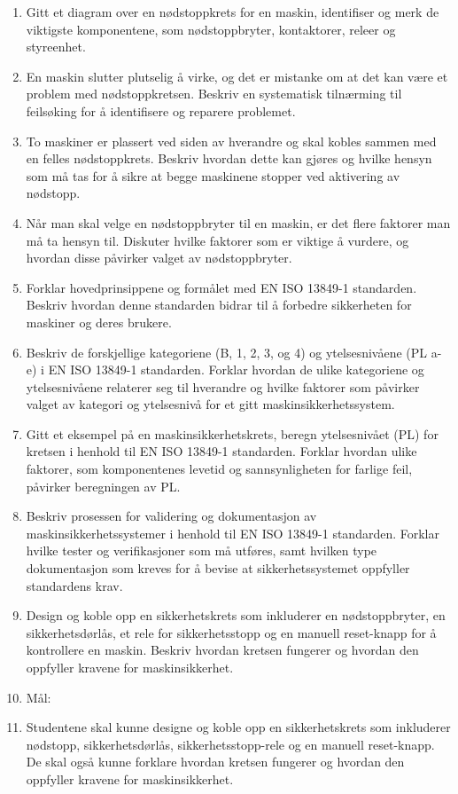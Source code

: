 \documentclass[12pt,a4paper]{article}
\begin{document}
\begin{enumerate}
	\item Gitt et diagram over en nødstoppkrets for en maskin, identifiser og merk de viktigste komponentene, som nødstoppbryter, kontaktorer, releer og styreenhet.
	\item En maskin slutter plutselig å virke, og det er mistanke om at det kan være et problem med nødstoppkretsen. Beskriv en systematisk tilnærming til feilsøking for å identifisere og reparere problemet.
	\item To maskiner er plassert ved siden av hverandre og skal kobles sammen med en felles nødstoppkrets. Beskriv hvordan dette kan gjøres og hvilke hensyn som må tas for å sikre at begge maskinene stopper ved aktivering av nødstopp.
	\item Når man skal velge en nødstoppbryter til en maskin, er det flere faktorer man må ta hensyn til. Diskuter hvilke faktorer som er viktige å vurdere, og hvordan disse påvirker valget av nødstoppbryter.
	\item Forklar hovedprinsippene og formålet med EN ISO 13849-1 standarden. Beskriv hvordan denne standarden bidrar til å forbedre sikkerheten for maskiner og deres brukere.
	\item Beskriv de forskjellige kategoriene (B, 1, 2, 3, og 4) og ytelsesnivåene (PL a-e) i EN ISO 13849-1 standarden. Forklar hvordan de ulike kategoriene og ytelsesnivåene relaterer seg til hverandre og hvilke faktorer som påvirker valget av kategori og ytelsesnivå for et gitt maskinsikkerhetssystem.
	\item Gitt et eksempel på en maskinsikkerhetskrets, beregn ytelsesnivået (PL) for kretsen i henhold til EN ISO 13849-1 standarden. Forklar hvordan ulike faktorer, som komponentenes levetid og sannsynligheten for farlige feil, påvirker beregningen av PL.
	\item Beskriv prosessen for validering og dokumentasjon av maskinsikkerhetssystemer i henhold til EN ISO 13849-1 standarden. Forklar hvilke tester og verifikasjoner som må utføres, samt hvilken type dokumentasjon som kreves for å bevise at sikkerhetssystemet oppfyller standardens krav.
	\item Design og koble opp en sikkerhetskrets som inkluderer en nødstoppbryter, en sikkerhetsdørlås, et rele for sikkerhetsstopp og en manuell reset-knapp for å kontrollere en maskin. Beskriv hvordan kretsen fungerer og hvordan den oppfyller kravene for maskinsikkerhet.
	\item Mål:
	\item Studentene skal kunne designe og koble opp en sikkerhetskrets som inkluderer nødstopp, sikkerhetsdørlås, sikkerhetsstopp-rele og en manuell reset-knapp. De skal også kunne forklare hvordan kretsen fungerer og hvordan den oppfyller kravene for maskinsikkerhet.

\end{enumerate}
\end{document}
